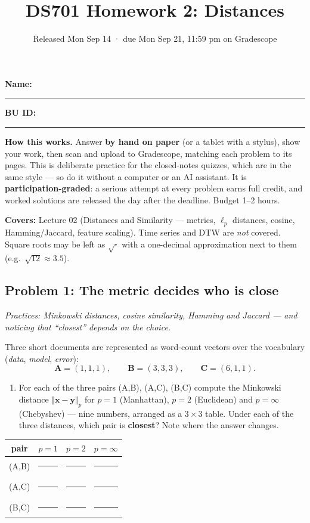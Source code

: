 \documentclass[
  11pt,
]{article}
\title{DS701 Homework 2: Distances}
\subtitle{Released Mon Sep 14 · due Mon Sep 21, 11:59 pm on Gradescope}
\author{}
\date{}
\providecommand{\tightlist}{%
  \setlength{\itemsep}{0pt}\setlength{\parskip}{0pt}}
\newcommand{\blank}[1][1.2in]{\rule{#1}{0.4pt}}
\begin{document}
\maketitle


\noindent\textbf{Name:}\ \rule{2.0in}{0.4pt}\qquad\textbf{BU ID:}\ \rule{1.2in}{0.4pt}
\vspace{6pt}

\textbf{How this works.} Answer \textbf{by hand on paper} (or a tablet
with a stylus), show your work, then scan and upload to Gradescope,
matching each problem to its pages. This is deliberate practice for the
closed-notes quizzes, which are in the same style --- so do it without a
computer or an AI assistant. It is \textbf{participation-graded}: a
serious attempt at every problem earns full credit, and worked solutions
are released the day after the deadline. Budget 1--2 hours.

\textbf{Covers:} Lecture 02 (Distances and Similarity --- metrics,
\(\ell_p\) distances, cosine, Hamming/Jaccard, feature scaling). Time
series and DTW are \emph{not} covered. Square roots may be left as
\(\sqrt{\cdot}\) with a one-decimal approximation next to them
(e.g.~\(\sqrt{12}\approx 3.5\)).

\subsection{Problem 1: The metric decides who is
close}\label{problem-1-the-metric-decides-who-is-close}

\emph{Practices: Minkowski distances, cosine similarity, Hamming and
Jaccard --- and noticing that ``closest'' depends on the choice.}

Three short documents are represented as word-count vectors over the
vocabulary (\emph{data}, \emph{model}, \emph{error}):
\[\mathbf{A} = (1, 1, 1),\qquad \mathbf{B} = (3, 3, 3),\qquad \mathbf{C} = (6, 1, 1).\]

\begin{enumerate}
\def\labelenumi{(\alph{enumi})}
\tightlist
\item
  For each of the three pairs (A,B), (A,C), (B,C) compute the Minkowski
  distance \(\Vert\mathbf{x}-\mathbf{y}\Vert_p\) for \(p = 1\)
  (Manhattan), \(p = 2\) (Euclidean) and \(p = \infty\) (Chebyshev) ---
  nine numbers, arranged as a \(3\times3\) table. Under each of the
  three distances, which pair is \textbf{closest}? Note where the answer
  changes.
\end{enumerate}

\begin{longtable}[]{@{}cccc@{}}
\toprule\noalign{}
pair & \(p=1\) & \(p=2\) & \(p=\infty\) \\
\midrule\noalign{}
\endhead
\bottomrule\noalign{}
\endlastfoot
(A,B) & \blank[0.8in] & \blank[0.8in] & \blank[0.8in] \\
(A,C) & \blank[0.8in] & \blank[0.8in] & \blank[0.8in] \\
(B,C) & \blank[0.8in] & \blank[0.8in] & \blank[0.8in] \\
\end{longtable}
\end{document}
